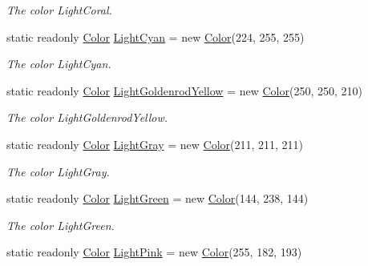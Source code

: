 \begin{DoxyCompactItemize}
\begin{DoxyCompactList}\small\item\em The color Light\-Coral. \end{DoxyCompactList}\item 
static readonly \hyperlink{struct_tri_devs_1_1_tri_engine2_d_1_1_color}{Color} \hyperlink{struct_tri_devs_1_1_tri_engine2_d_1_1_color_a764ff644d5a09f1fd9a3ac657c7f3d12}{Light\-Cyan} = new \hyperlink{struct_tri_devs_1_1_tri_engine2_d_1_1_color}{Color}(224, 255, 255)
\begin{DoxyCompactList}\small\item\em The color Light\-Cyan. \end{DoxyCompactList}\item 
static readonly \hyperlink{struct_tri_devs_1_1_tri_engine2_d_1_1_color}{Color} \hyperlink{struct_tri_devs_1_1_tri_engine2_d_1_1_color_afa870652dc63537ba76226b8e98171eb}{Light\-Goldenrod\-Yellow} = new \hyperlink{struct_tri_devs_1_1_tri_engine2_d_1_1_color}{Color}(250, 250, 210)
\begin{DoxyCompactList}\small\item\em The color Light\-Goldenrod\-Yellow. \end{DoxyCompactList}\item 
static readonly \hyperlink{struct_tri_devs_1_1_tri_engine2_d_1_1_color}{Color} \hyperlink{struct_tri_devs_1_1_tri_engine2_d_1_1_color_a19abb41d6b8275c2ed879f11d2145e56}{Light\-Gray} = new \hyperlink{struct_tri_devs_1_1_tri_engine2_d_1_1_color}{Color}(211, 211, 211)
\begin{DoxyCompactList}\small\item\em The color Light\-Gray. \end{DoxyCompactList}\item 
static readonly \hyperlink{struct_tri_devs_1_1_tri_engine2_d_1_1_color}{Color} \hyperlink{struct_tri_devs_1_1_tri_engine2_d_1_1_color_a1263330cbc9bcb2e0219d4b96c91b25e}{Light\-Green} = new \hyperlink{struct_tri_devs_1_1_tri_engine2_d_1_1_color}{Color}(144, 238, 144)
\begin{DoxyCompactList}\small\item\em The color Light\-Green. \end{DoxyCompactList}\item 
static readonly \hyperlink{struct_tri_devs_1_1_tri_engine2_d_1_1_color}{Color} \hyperlink{struct_tri_devs_1_1_tri_engine2_d_1_1_color_af9d2d370d6e45c11982ca540ed6a65bd}{Light\-Pink} = new \hyperlink{struct_tri_devs_1_1_tri_engine2_d_1_1_color}{Color}(255, 182, 193)

\end{DoxyCompactItemize}
